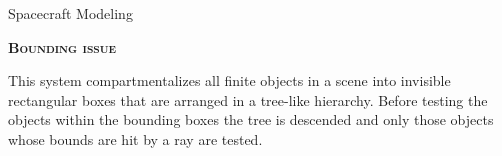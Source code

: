 \documentclass[10pt]{beamer}
\begin{document}
\begin{frame}{Spacecraft Modeling}

  \bigskip

  \textsc{\textbf{\large Bounding issue}}

  \bigskip

This system compartmentalizes all finite objects in a scene into invisible rectangular boxes that are arranged in a tree-like hierarchy. Before testing the objects within the bounding boxes the tree is descended and only those objects whose bounds are hit by a ray are tested.

  \smallskip

  \begin{figure}
    \captionsetup[subfigure]{labelformat=empty}
    \centering
    \qquad
    \qquad
  \end{figure}

  \bigskip
\end{frame}
\end{document}
